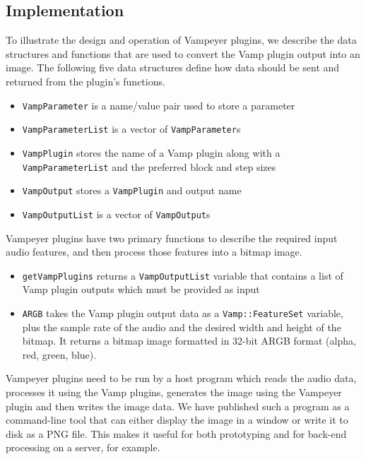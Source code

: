\subsection{Implementation}
To illustrate the design and operation of Vampeyer plugins, we describe the data structures and functions that are used
to convert the Vamp plugin output into an image.  The following five data structures define how data should be sent and
returned from the plugin's functions.

{\singlespacing
\begin{itemize}
  \item \texttt{VampParameter} is a name/value pair used to store a parameter
  \item \texttt{VampParameterList} is a vector of \texttt{VampParameter}s
  \item \texttt{VampPlugin} stores the name of a Vamp plugin along with a\\
    \texttt{VampParameterList} and the preferred block and step sizes
  \item \texttt{VampOutput} stores a \texttt{VampPlugin} and output name
  \item \texttt{VampOutputList} is a vector of \texttt{VampOutput}s
\end{itemize}
}

Vampeyer plugins have two primary functions to describe the required input audio features, and then process those
features into a bitmap image.

\begin{itemize}
  \item \texttt{getVampPlugins} returns a \texttt{VampOutputList} variable that contains a list of Vamp plugin outputs
    which must be provided as input
  \item \texttt{ARGB} takes the Vamp plugin output data as a \texttt{Vamp::FeatureSet} variable, plus the sample rate
    of the audio and the desired width and height of the bitmap. It returns a bitmap image formatted in 32-bit ARGB
    format (alpha, red, green, blue).
\end{itemize}

Vampeyer plugins need to be run by a host program which reads the audio data, processes it using the Vamp plugins,
generates the image using the Vampeyer plugin and then writes the image data. We have published such a program as a
command-line tool that can either display the image in a window or write it to disk as a PNG file. This makes it useful
for both prototyping and for back-end processing on a server, for example.

